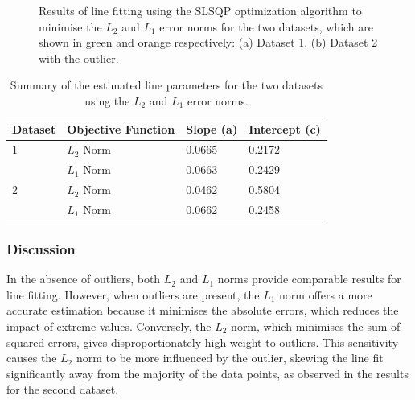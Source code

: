 \documentclass[11pt]{article}
\begin{document}
\begin{figure}[H]
\begin{subfigure}{.45\textwidth}
        \caption{}
        \label{fig:line_fit_2}
    \end{subfigure}%
    \caption{Results of line fitting using the SLSQP optimization algorithm to minimise the \(L_2\) and \(L_1\) error norms for the two datasets, which are shown in green and orange respectively: (a) Dataset 1, (b) Dataset 2 with the outlier.}
    \label{fig:line_fitting_results}
\end{figure}

\begin{table}[H]
    \centering
    \begin{tabular}{@{}llll@{}}
    \toprule
    \textbf{Dataset} & \textbf{Objective Function} & \textbf{Slope (a)} & \textbf{Intercept (c)} \\ \midrule
    1               & \(L_2\) Norm                & 0.0665             & 0.2172                 \\
                    & \(L_1\) Norm                & 0.0663             & 0.2429                 \\ \midrule
    2               & \(L_2\) Norm                & 0.0462             & 0.5804                 \\
                    & \(L_1\) Norm                & 0.0662             & 0.2458                 \\ \bottomrule
    \end{tabular}
    \caption{Summary of the estimated line parameters for the two datasets using the \(L_2\) and \(L_1\) error norms.}
    \label{tab:line_fitting_results}
\end{table}

\subsubsection{Discussion}
In the absence of outliers, both \(L_2\) and \(L_1\) norms provide comparable results for line fitting. However, when outliers are present, the \(L_1\) norm offers a more accurate estimation because it minimises the absolute errors, which reduces the impact of extreme values. Conversely, the \(L_2\) norm, which minimises the sum of squared errors, gives disproportionately high weight to outliers. This sensitivity causes the \(L_2\) norm to be more influenced by the outlier, skewing the line fit significantly away from the majority of the data points, as observed in the results for the second dataset.
\end{document}
